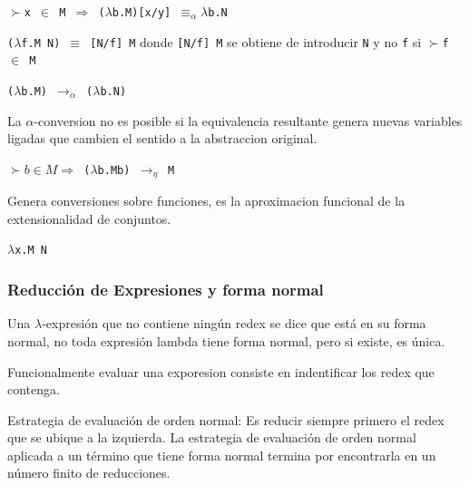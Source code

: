 \begin{defn}\end{defn}

\texttt{$\succ$x $\in$ M $\Rightarrow$ ($\lambda$b.M)[x/y] $\equiv_{\alpha} \lambda$b.N}

\begin{defn}\end{defn}
\texttt{($\lambda$f.M N) $\equiv$ [N/f] M} donde
\texttt{[N/f] M} se obtiene de introducir \texttt{N} y no \texttt{f} si \texttt{$\succ$f $\in$ M}

\begin{defn}\end{defn}
\texttt{($\lambda$b.M) $\rightarrow_{\alpha}$ ($\lambda$b.N)}
 
\begin{note}
La $\alpha$-conversion no es posible si la equivalencia resultante genera nuevas variables ligadas que cambien el sentido a la abstraccion original.
\end{note}

\begin{defn}\end{defn}
\texttt{$\succ b \in M \Rightarrow$ ($\lambda$b.Mb) $\rightarrow_{\eta}$ M}
\begin{note}
Genera conversiones sobre funciones, es la aproximacion funcional de la extensionalidad de conjuntos.
\end{note}

\begin{defn}[Redex ]\end{defn}
\texttt{$\lambda$x.M N}

\subsubsection{Reducción de Expresiones y forma normal}

Una $\lambda$-expresión que no contiene ningún redex se dice que está en su forma normal, no toda expresión lambda tiene forma normal, pero si existe, es única.

\begin{note}
Funcionalmente evaluar una exporesion consiste en indentificar los redex que contenga.
\end{note}

Estrategia de evaluación de orden normal:  
Es reducir siempre primero el redex que se ubique a la izquierda. La estrategia de evaluación de orden normal aplicada a un término que tiene forma normal termina por encontrarla en un número finito de reducciones.

